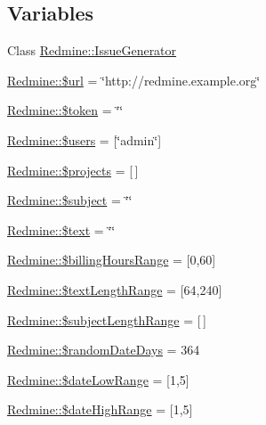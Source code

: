 \subsection*{Variables}
\begin{DoxyCompactItemize}
\item 
Class \mbox{\hyperlink{namespace_redmine_ab0fb626e08a4e2863ce0701d1539b043}{Redmine\+::\+Issue\+Generator}}
\item 
\mbox{\hyperlink{namespace_redmine_aae663160ee40da764967a699dd5fbbe5}{Redmine\+::\$url}} = \char`\"{}http\+://redmine.\+example.\+org\char`\"{}
\item 
\mbox{\hyperlink{namespace_redmine_af35ef66fbfaff27c9b9fee3af83aead8}{Redmine\+::\$token}} = \char`\"{}\char`\"{}
\item 
\mbox{\hyperlink{namespace_redmine_a7053bf0e8991cc3d8b797140b7998f16}{Redmine\+::\$users}} = \mbox{[}\char`\"{}admin\char`\"{}\mbox{]}
\item 
\mbox{\hyperlink{namespace_redmine_a8b45f4e08d41649324ad1f604cebbaae}{Redmine\+::\$projects}} = \mbox{[}$\,$\mbox{]}
\item 
\mbox{\hyperlink{namespace_redmine_aaaacf5ec70a64626187799a2ef952359}{Redmine\+::\$subject}} = \char`\"{}\char`\"{}
\item 
\mbox{\hyperlink{namespace_redmine_a7e88a99f5ec14d688bb904a2dc5596cc}{Redmine\+::\$text}} = \char`\"{}\char`\"{}
\item 
\mbox{\hyperlink{namespace_redmine_aa2eb1c85048add3a8487c091df7a7de0}{Redmine\+::\$billing\+Hours\+Range}} = \mbox{[}0,60\mbox{]}
\item 
\mbox{\hyperlink{namespace_redmine_a4ac80590cf30689fbdc00c8c102e7145}{Redmine\+::\$text\+Length\+Range}} = \mbox{[}64,240\mbox{]}
\item 
\mbox{\hyperlink{namespace_redmine_ace7543b94df52916c5952a5f727d0563}{Redmine\+::\$subject\+Length\+Range}} = \mbox{[}$\,$\mbox{]}
\item 
\mbox{\hyperlink{namespace_redmine_ae79d9d8a3382e493ff824bfa7b3b023a}{Redmine\+::\$random\+Date\+Days}} = 364
\item 
\mbox{\hyperlink{namespace_redmine_aac536a4553d683b37596fe4c8175db31}{Redmine\+::\$date\+Low\+Range}} = \mbox{[}1,5\mbox{]}
\item 
\mbox{\hyperlink{namespace_redmine_addc1d11062505beb178bff37c0d15543}{Redmine\+::\$date\+High\+Range}} = \mbox{[}1,5\mbox{]}
\end{DoxyCompactItemize}
